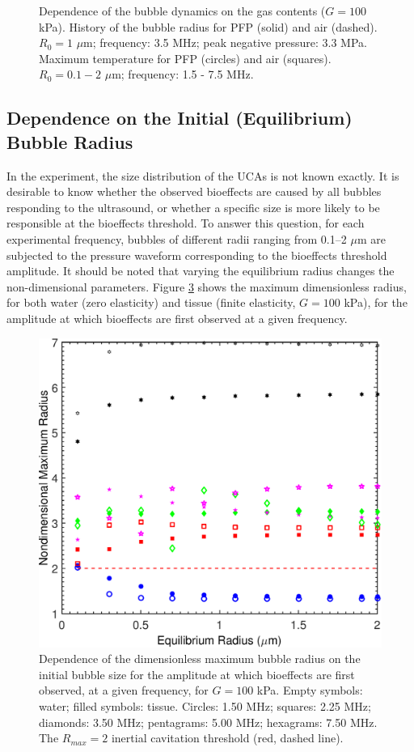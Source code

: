 \begin{figure}[t]
\begin{subfigure}{0.47\textwidth}
    \caption[Maximum temperature for PFP and air]{}
    \label{fig:usbe_bubble_pfpair_temp}
  \end{subfigure}
  \caption[Dependence of the bubble dynamics on the gas contents
  ($G=100$ kPa).]{Dependence of the bubble dynamics on the gas
    contents ($G=100$ kPa). 
    History of the bubble radius for PFP (solid) and air
    (dashed). $R_0=1$ $\mu$m; frequency: 3.5 MHz; peak negative
    pressure: 3.3 MPa.  Maximum
    temperature for PFP (circles) and air (squares). $R_0=0.1-2$
    $\mu$m; frequency: 1.5 - 7.5 MHz.}
  \label{fig:gascontents}
\end{figure}


\subsection{Dependence on the Initial (Equilibrium) Bubble Radius}

In the experiment, the size distribution of the UCAs is not known
exactly. It is desirable to know whether the observed bioeffects are
caused by all bubbles responding to the ultrasound, or whether a
specific size is more likely to be responsible at the bioeffects
threshold. To answer this question, for each experimental frequency,
bubbles of different radii ranging from 0.1--2 $\mu$m are subjected to
the pressure waveform corresponding to the bioeffects threshold
amplitude. It should be noted that varying the equilibrium radius
changes the non-dimensional parameters. Figure \ref{fig:size} shows the maximum dimensionless
radius, for both water (zero elasticity) and tissue (finite
elasticity, $G=100$ kPa), for the amplitude at which bioeffects are
first observed at a given frequency.

\begin{figure}[t]
  \centering
  \includegraphics[width=.47\textwidth]{figs/bubble_figs/Rstarmax_R0}
  \caption[Dependence of the dimensionless maximum bubble radius on
  the initial bubble size for the amplitude at which bioeffects are
  first observed, at a given frequency, for $G=100$ kPa]{Dependence of
    the dimensionless maximum bubble radius on the initial bubble size
    for the amplitude at which bioeffects are first observed, at a
    given frequency, for $G=100$ kPa. Empty symbols: water; filled
    symbols: tissue. Circles: 1.50 MHz; squares: 2.25 MHz; diamonds:
    3.50 MHz; pentagrams: 5.00 MHz; hexagrams: 7.50 MHz. The
    $R_{max}=2$ inertial cavitation threshold (red, dashed line).}
  \label{fig:size}
\end{figure}


